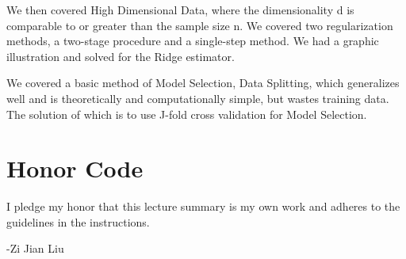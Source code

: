 \documentclass[twoside]{article}
\theoremstyle{definition}
\theoremstyle{definition}
\theoremstyle{remark}
\begin{document}
	We then covered High Dimensional Data, where the dimensionality d is comparable to or greater than the sample size n. We covered two regularization methods, a two-stage procedure and a single-step method. We had a graphic illustration and solved for the Ridge estimator.
	
	We covered a basic method of Model Selection, Data Splitting, which generalizes well and is theoretically and computationally simple, but wastes training data. The solution of which is to use J-fold cross validation for Model Selection.
	
	
	\section*{Honor Code}
	
	I pledge my honor that this lecture summary is my own work and adheres to the guidelines in the instructions.
	
	-Zi Jian Liu
\end{document}

